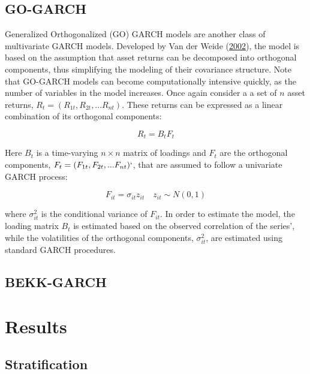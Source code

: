 \documentclass[11pt,preprint, authoryear]{elsarticle}
\numberwithin{equation}{section}
\numberwithin{figure}{section}
\numberwithin{table}{section}
\begin{document}
\hypertarget{go-garch}{%
\subsection{GO-GARCH}\label{go-garch}}

Generalized Orthogonalized (GO) GARCH models are another class of
multivariate GARCH models. Developed by Van der Weide
(\protect\hyperlink{ref-VanDerWeide2002}{2002}), the model is based on
the assumption that asset returns can be decomposed into orthogonal
components, thus simplifying the modeling of their covariance structure.
Note that GO-GARCH models can become computationally intensive quickly,
as the number of variables in the model increases. Once again consider a
a set of \(n\) asset returns, \(R_t = (R_{1t}, R_{2t}, ... R_{nt})\).
These returns can be expressed as a linear combination of its orthogonal
components:

\begin{equation}
R_t = B_t F_t \label{eq4}
\end{equation}

Here \(B_t\) is a time-varying \(n \times n\) matrix of loadings and
\(F_t\) are the orthogonal components,
\(F_t = (F_{1t}, F_{2t}, ... F_{nt})`\), that are assumed to follow a
univariate GARCH process:

\begin{equation}
F_{it} = \sigma_{it}z_{it} \quad z_{it} \sim N(0,1)\label{eq5}
\end{equation}

where \(\sigma^2_{it}\) is the conditional variance of \(F_{it}\). In
order to estimate the model, the loading matrix \(B_t\) is estimated
based on the observed correlation of the series', while the volatilities
of the orthogonal components, \(\sigma^2_{it}\), are estimated using
standard GARCH procedures.

\hypertarget{bekk-garch}{%
\subsection{BEKK-GARCH}\label{bekk-garch}}

\hypertarget{results}{%
\section{Results}\label{results}}

\hypertarget{stratification}{%
\subsection{Stratification}\label{stratification}}
\end{document}
